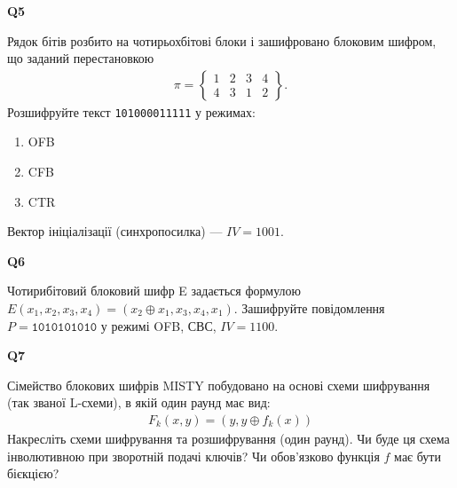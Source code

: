 \documentclass{../../test-template}
\begin{document}
\begin{tcolorbox}[lowerbox=invisible,colback=white]
    \begin{minipage}{0.1\textwidth}
        \raggedright
        \vspace*{\fill}
            \textbf{Q5}
        \vspace*{\fill}
        \end{minipage}
        \begin{minipage}{0.75\textwidth}
        Рядок бітів розбито на чотирьохбітові блоки і зашифровано блоковим
шифром, що заданий перестановкою 
\begin{align*}
    \pi=\left\{\begin{array}{сссс}
    1 & 2 & 3 & 4  \\
     4 & 3 & 1 & 2 \end{array}\right\}.
\end{align*}
Розшифруйте текст \texttt{101000011111} у режимах:
\begin{enumerate}
    \item OFB
    \item CFB
    \item CTR
\end{enumerate}
Вектор ініціалізації (синхропосилка) --- $IV=1001$.
        \end{minipage}
\end{tcolorbox}

\begin{tcolorbox}[lowerbox=invisible,colback=white]
    \begin{minipage}{0.1\textwidth}
        \raggedright
        \vspace*{\fill}
            \textbf{Q6}
        \vspace*{\fill}
        \end{minipage}
        \begin{minipage}{0.75\textwidth}
       Чотирибітовий блоковий шифр E задається формулою
$E(x_1, x_2, x_3, x_4) = (x_2 \oplus x_1, x_3, x_4, x_1)$.
Зашифруйте повідомлення $P = \texttt{1010101010}$ у режимі OFB, СВС, $IV = 1100$.
\end{minipage}
\end{tcolorbox}
\begin{tcolorbox}[lowerbox=invisible,colback=white]
    \begin{minipage}{0.1\textwidth}
        \raggedright
        \vspace*{\fill}
            \textbf{Q7}
        \vspace*{\fill}
        \end{minipage}
        \begin{minipage}{0.75\textwidth}
Сімейство блокових шифрів MISTY побудовано на основі схеми шифрування (так званої L-схеми), в якій один раунд має вид:
\begin{align*}
    F_k(x,y)=(y,y\oplus f_k(x))
\end{align*}
Накресліть схеми шифрування та розшифрування (один раунд). Чи буде ця схема інволютивною при зворотній подачі ключів? Чи обов’язково функція $f$ має бути бієкцією?
    \end{minipage}
\end{tcolorbox}
\end{document}
